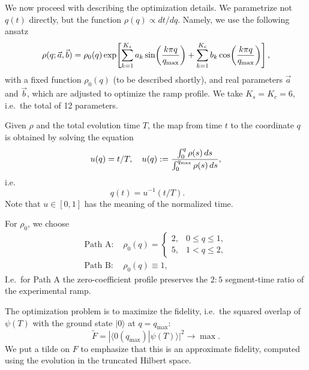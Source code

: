 \documentclass[a4paper,11pt]{article}
\theoremstyle{remark}
\theoremstyle{theorem}
\begin{document}
We now proceed with describing the optimization details. We parametrize not
$q (t)$ directly, but the function $\rho (q) \propto d t / d q$. Namely, we
use the following ansatz
\begin{equation}
	\rho (q ; \vec{a}, \vec{b}) = \rho_0 (q) \exp \hspace{-0.17em} \left[
	\sum_{k = 1}^{K_s} a_k \sin \hspace{-0.17em} \left( \frac{k \pi q}{q_{\max}}
	\right) + \sum_{k = 1}^{K_c} b_k \cos \hspace{-0.17em} \left( \frac{k \pi
		q}{q_{\max}} \right) \right], \label{eq:density}
\end{equation}
with a fixed function $\rho_0 (q)$ (to be described shortly), and real
parameters $\vec{a}$ and $\vec{b}$, which are adjusted to optimize the ramp
profile. We take $K_s = K_c = 6$, i.e.~the total of 12 parameters.

Given $\rho$ and the total evolution time $T$, the map from time $t$ to the
coordinate $q$ is obtained by solving the equation
\begin{equation}
	u (q) = t / T, \quad u (q) : = \frac{\int_0^q \rho (s) \hspace{0.17em} d
		s}{\int_0^{q_{\max}} \rho (s) \hspace{0.17em} d s}, \label{eq:clock1}
\end{equation}
i.e.
\begin{equation}
	q (t) = u^{- 1}  (t / T) . \qquad \label{eq:clock}
\end{equation}
Note that $u \in [0, 1]$ has the meaning of the normalized time.

For $\rho_0$, we choose
\begin{align}
	\text{Path A: } & \rho_0 (q) = \left\{\begin{array}{ll}
		2, & 0 \leq q \leq 1,\\
		5, & 1 < q \leq 2,
	\end{array}\right. \nonumber\\
	\text{Path B: } &\rho_0 (q) \equiv 1, \label{rho0B}
\end{align}
I.e.~for Path A the zero-coefficient profile preserves the $2 : 5$
segment-time ratio of the experimental ramp.

The optimization problem is to maximize the fidelity, i.e.~the squared overlap
of $\psi (T)$ with the ground state $|0 \rangle$ at $q = q_{\max}$:
\begin{equation}
	\tilde F  = | \langle 0 (q_{\max}) | \psi  (T) \rangle |^2 \rightarrow \max .
	\label{eq:f20}
\end{equation}
We put a tilde on $F$ to emphasize that this is an approximate fidelity, computed using the evolution in the truncated Hilbert space.
\end{document}

